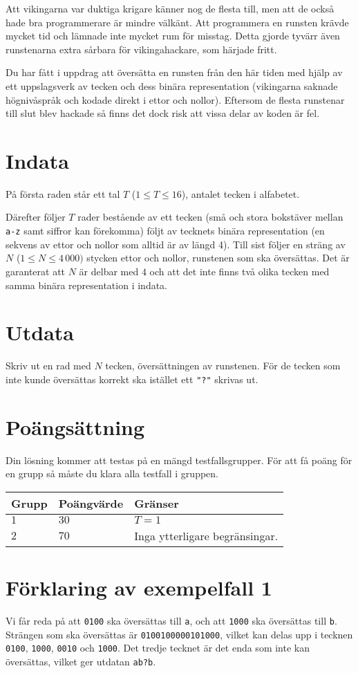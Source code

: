 Att vikingarna var duktiga krigare känner nog de flesta till, men att de också hade bra programmerare är mindre välkänt.
Att programmera en runsten krävde mycket tid och lämnade inte mycket rum för misstag.
Detta gjorde tyvärr även runstenarna extra sårbara för vikingahackare, som härjade fritt.

Du har fått i uppdrag att översätta en runsten från den här tiden med hjälp av ett uppslagsverk av tecken och dess binära representation
(vikingarna saknade högnivåspråk och kodade direkt i ettor och nollor). Eftersom de flesta runstenar till slut blev hackade så finns
det dock risk att vissa delar av koden är fel.

\section*{Indata}
På första raden står ett tal $T$ ($1 \le T \le 16$), antalet tecken i alfabetet.

Därefter följer $T$ rader bestående av ett tecken (små och stora bokstäver mellan \texttt{a-z} samt siffror kan förekomma) följt av tecknets binära representation
(en sekvens av ettor och nollor som alltid är av längd 4).
Till sist följer en sträng av $N$ ($1 \leq N \leq 4\,000)$ stycken ettor och nollor, runstenen som ska översättas. Det är garanterat att $N$ är delbar med $4$ och att det inte finns två olika tecken med samma binära representation i indata.

\section*{Utdata}
Skriv ut en rad med $N$ tecken, översättningen av runstenen. För de tecken som inte kunde översättas korrekt ska istället ett \texttt{"?"} skrivas ut.

\section*{Poängsättning}
Din lösning kommer att testas på en mängd testfallsgrupper.
För att få poäng för en grupp så måste du klara alla testfall i gruppen.

\noindent
\begin{tabular}{| l | l | p{12cm} |}
  \hline
  Grupp & Poängvärde & Gränser \\ \hline
  $1$    & $30$        & $T = 1$ \\ \hline 
  $2$    & $70$        & Inga ytterligare begränsingar. \\ \hline 
\end{tabular}

\section*{Förklaring av exempelfall 1}
Vi får reda på att \texttt{0100} ska översättas till \texttt{a}, och att \texttt{1000} ska översättas till \texttt{b}.
Strängen som ska översättas är \texttt{0100100000101000}, vilket kan delas upp i tecknen \texttt{0100}, \texttt{1000}, \texttt{0010} och \texttt{1000}.
Det tredje tecknet är det enda som inte kan översättas, vilket ger utdatan \texttt{ab?b}.
